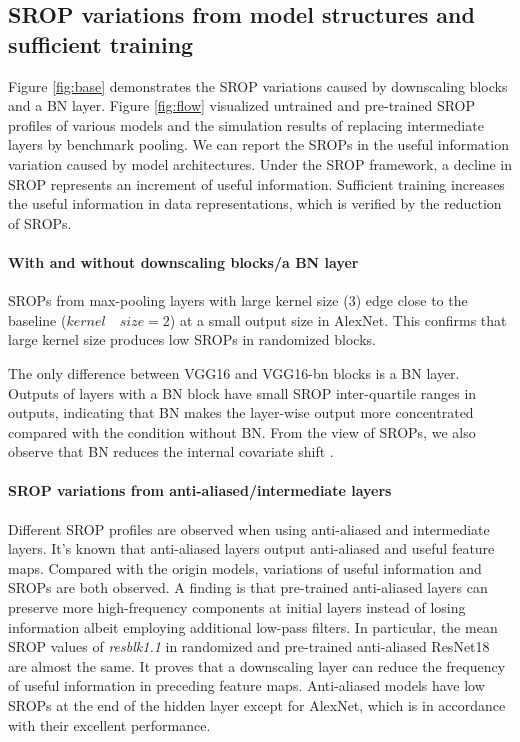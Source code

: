 \documentclass{article}
\begin{document}
\subsection{SROP variations from model structures and sufficient training}
Figure \ref{fig:base} demonstrates the SROP variations caused by downscaling blocks and a BN layer. Figure \ref{fig:flow} visualized untrained and pre-trained SROP profiles of various models and the simulation results of replacing intermediate layers by benchmark pooling. We can report the SROPs in the useful information variation caused by model architectures. Under the SROP framework, a decline in SROP represents an increment of useful information. Sufficient training increases the useful information in data representations, which is verified by the reduction of SROPs.

\paragraph{With and without downscaling blocks/a BN layer}
SROPs from max-pooling layers with large kernel size (3) edge close to the baseline ($kernel \quad size=2$) at a small output size in AlexNet. This confirms that large kernel size produces low SROPs in randomized blocks.

The only difference between VGG16 and VGG16-bn blocks is a BN layer. Outputs of layers with a BN block have small SROP inter-quartile ranges in outputs, indicating that BN makes the layer-wise output more concentrated compared with the condition without BN. From the view of SROPs, we also observe that BN reduces the internal covariate shift \cite{bn}.
\paragraph{SROP variations from anti-aliased/intermediate layers}
Different SROP profiles are observed when using anti-aliased and intermediate layers. It's known that anti-aliased layers output anti-aliased and useful feature maps. Compared with the origin models, variations of useful information and SROPs are both observed. A finding is that pre-trained anti-aliased layers can preserve more high-frequency components at initial layers instead of losing information albeit employing additional low-pass filters. In particular, the mean SROP values of \textit{resblk1.1} in randomized and pre-trained anti-aliased ResNet18 are almost the same. It proves that a downscaling layer can reduce the frequency of useful information in preceding feature maps. Anti-aliased models have low SROPs at the end of the hidden layer except for AlexNet, which is in accordance with their excellent performance.
\end{document}
